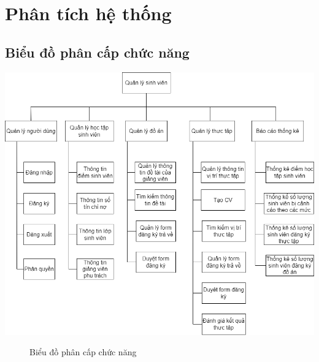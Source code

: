 \chapter{Phân tích hệ thống}
  \section{Biểu đồ phân cấp chức năng}
    \begin{center}
      \includegraphics[width=1.05\textwidth]{../drawio/bieudophancapchucnang.drawio.png}
      \begin{figure}
        \centering
        \caption{Biểu đồ phân cấp chức năng}
      \end{figure}
    \end{center}

